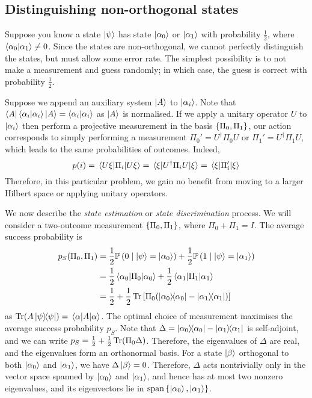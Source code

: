 \subsection{Distinguishing non-orthogonal states}
Suppose you know a state \( \ket{\psi} \) has state \( \ket{\alpha_0} \) or \( \ket{\alpha_1} \) with probability \( \frac{1}{2} \), where \( \ip{\alpha_0}{\alpha_1} \neq 0 \).
Since the states are non-orthogonal, we cannot perfectly distinguish the states, but must allow some error rate.
The simplest possibility is to not make a measurement and guess randomly; in which case, the guess is correct with probability \( \frac{1}{2} \).

Suppose we append an auxiliary system \( \ket{A} \) to \( \ket{\alpha_i} \).
Note that \( \bra{A}\bra{\alpha_i}\ket{\alpha_i}\ket{A} = \ip{\alpha_i}{\alpha_i} \) as \( \ket{A} \) is normalised.
If we apply a unitary operator \( U \) to \( \ket{\alpha_i} \) then perform a projective measurement in the basis \( \qty{\Pi_0, \Pi_1} \), our action corresponds to simply performing a measurement \( \Pi_0' = U^\dagger \Pi_0 U \) or \( \Pi_1' = U^\dagger \Pi_1 U \), which leads to the same probabilities of outcomes.
Indeed,
\[ p(i) = \ev{\Pi_i}{U\xi} = \ev{U^\dagger \Pi_i U}{\xi} = \ev{\Pi_i'}{\xi} \]
Therefore, in this particular problem, we gain no benefit from moving to a larger Hilbert space or applying unitary operators.

We now describe the \emph{state estimation} or \emph{state discrimination} process.
We will consider a two-outcome measurement \( \qty{\Pi_0, \Pi_1} \), where \( \Pi_0 + \Pi_1 = I \).
The average success probability is
\begin{align*}
    p_S(\Pi_0, \Pi_1) &= \frac{1}{2} \prob{0 \mid \ket{\psi} = \ket{\alpha_0}} + \frac{1}{2} \prob{1 \mid \ket{\psi} = \ket{\alpha_1}} \\
    &= \frac{1}{2}\ev{\Pi_0}{\alpha_0} + \frac{1}{2}\ev{\Pi_1}{\alpha_1} \\
    &= \frac{1}{2} + \frac{1}{2} \Tr \qty[\Pi_0 \qty(\op{\alpha_0}{\alpha_0} - \op{\alpha_1}{\alpha_1})]
\end{align*}
as \( \Tr(A\op{\psi}{\psi}) = \ev{A}{\alpha} \).
The optimal choice of measurement maximises the average success probability \( p_S \).
Note that \( \Delta = \op{\alpha_0}{\alpha_0} - \op{\alpha_1}{\alpha_1} \) is self-adjoint, and we can write \( p_S = \frac{1}{2} + \frac{1}{2} \Tr(\Pi_0 \Delta) \).
Therefore, the eigenvalues of \( \Delta \) are real, and the eigenvalues form an orthonormal basis.
For a state \( \ket{\beta} \) orthogonal to both \( \ket{\alpha_0} \) and \( \ket{\alpha_1} \), we have \( \Delta \ket{\beta} = 0 \).
Therefore, \( \Delta \) acts nontrivially only in the vector space spanned by \( \ket{\alpha_0} \) and \( \ket{\alpha_1} \), and hence has at most two nonzero eigenvalues, and its eigenvectors lie in \( \operatorname{span}\qty{\ket{\alpha_0}, \ket{\alpha_1}} \).

